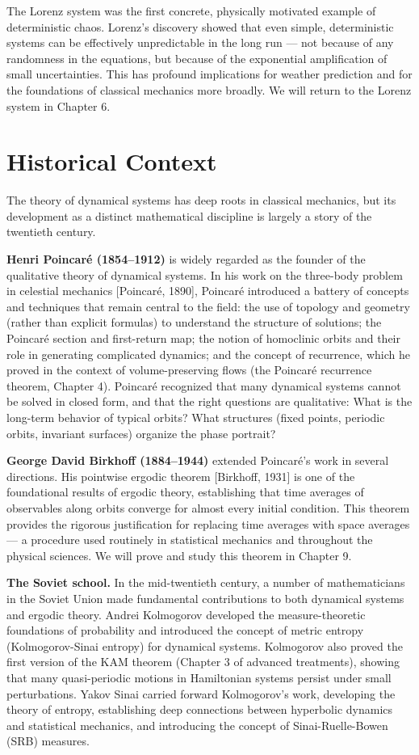 The Lorenz system was the first concrete, physically motivated example of deterministic chaos. Lorenz's discovery showed that even simple, deterministic systems can be effectively unpredictable in the long run --- not because of any randomness in the equations, but because of the exponential amplification of small uncertainties. This has profound implications for weather prediction and for the foundations of classical mechanics more broadly. We will return to the Lorenz system in Chapter 6.


\section{Historical Context}\label{sec:1.5}

The theory of dynamical systems has deep roots in classical mechanics, but its development as a distinct mathematical discipline is largely a story of the twentieth century.

\textbf{Henri Poincaré (1854--1912)} is widely regarded as the founder of the qualitative theory of dynamical systems. In his work on the three-body problem in celestial mechanics [Poincaré, 1890], Poincaré introduced a battery of concepts and techniques that remain central to the field: the use of topology and geometry (rather than explicit formulas) to understand the structure of solutions; the Poincaré section and first-return map; the notion of homoclinic orbits and their role in generating complicated dynamics; and the concept of recurrence, which he proved in the context of volume-preserving flows (the Poincaré recurrence theorem, Chapter 4). Poincaré recognized that many dynamical systems cannot be solved in closed form, and that the right questions are qualitative: What is the long-term behavior of typical orbits? What structures (fixed points, periodic orbits, invariant surfaces) organize the phase portrait?

\textbf{George David Birkhoff (1884--1944)} extended Poincaré's work in several directions. His pointwise ergodic theorem [Birkhoff, 1931] is one of the foundational results of ergodic theory, establishing that time averages of observables along orbits converge for almost every initial condition. This theorem provides the rigorous justification for replacing time averages with space averages --- a procedure used routinely in statistical mechanics and throughout the physical sciences. We will prove and study this theorem in Chapter 9.

\textbf{The Soviet school.} In the mid-twentieth century, a number of mathematicians in the Soviet Union made fundamental contributions to both dynamical systems and ergodic theory. Andrei Kolmogorov developed the measure-theoretic foundations of probability and introduced the concept of metric entropy (Kolmogorov-Sinai entropy) for dynamical systems. Kolmogorov also proved the first version of the KAM theorem (Chapter 3 of advanced treatments), showing that many quasi-periodic motions in Hamiltonian systems persist under small perturbations. Yakov Sinai carried forward Kolmogorov's work, developing the theory of entropy, establishing deep connections between hyperbolic dynamics and statistical mechanics, and introducing the concept of Sinai-Ruelle-Bowen (SRB) measures.

